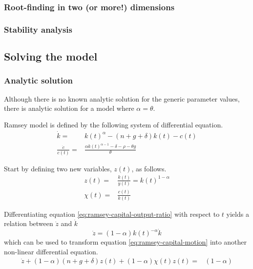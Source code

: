 \documentclass[11pt]{article}
\begin{document}
\subsubsection{Root-finding in two (or more!) dimensions}

\subsubsection{Stability analysis}

 \subsection{Solving the model}
 
 \subsubsection{Analytic solution}
 Although there is no known analytic solution for the generic parameter values, there is analytic solution for a model where $\alpha = \theta$.
 
Ramsey model is defined by the following system of differential equation.
 \begin{align}
 	\dot{k} =& k(t)^{\alpha} - (n+g+\delta)k(t) - c(t)  \label{eq:ramsey-capital-motion}\\
	\frac{\dot{c}}{c(t)} =& \frac{\alpha k(t)^{\alpha-1} - \delta - \rho - \theta g}{\theta} \label{eq:ramsey-consumption-euler}
 \end{align}

Start by defining two new variables, $z(t)$, as follows. 
\begin{align}
	z(t) =& \frac{k(t)}{y(t)} = k(t)^{1-\alpha} \label{eq:ramsey-capital-output-ratio} \\
	\chi(t) =& \frac{c(t)}{k(t)} \label{eq:ramsey-consumption-capital-ratio}
\end{align}

Differentiating equation \ref{eq:ramsey-capital-output-ratio} with respect to $t$ yields a relation between $\dot{z}$ and $\dot{k}$ 
\begin{equation}
	\dot{z} = (1 - \alpha)k(t)^{-\alpha}\dot{k}
\end{equation}
which can be used to transform equation \ref{eq:ramsey-capital-motion} into another non-linear differential equation.
\begin{align}\label{eq:ramsey-capital-output-motion}
	\dot{z} + (1-\alpha)(n+g+\delta)z(t) + (1-\alpha)\chi(t)z(t) =& (1 - \alpha)
\end{align}
\end{document}
